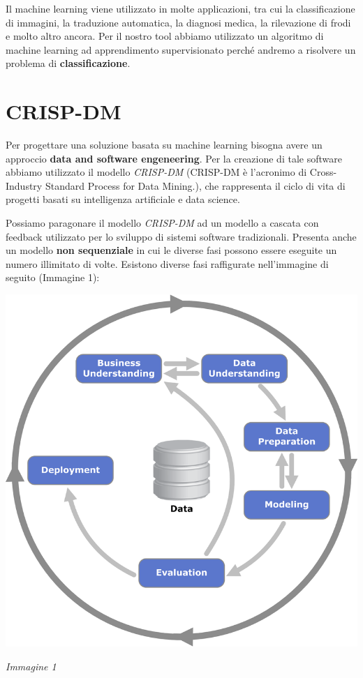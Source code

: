 \documentclass[12pt]{article}
\begin{document}
Il machine learning viene utilizzato in molte applicazioni, tra cui la classificazione di immagini, la traduzione automatica, la diagnosi medica, la rilevazione di frodi e molto altro ancora.
Per il nostro tool abbiamo utilizzato un algoritmo di machine learning ad apprendimento supervisionato perché andremo a risolvere un problema di \textbf{classificazione}.

\section{CRISP-DM}
Per progettare una soluzione basata su machine learning bisogna avere un approccio \textbf{data and software engeneering}.
Per la creazione di tale software abbiamo utilizzato il modello \textit{CRISP-DM} (CRISP-DM è l’acronimo di Cross-Industry Standard Process for Data Mining.),
che rappresenta il ciclo di vita di progetti basati su intelligenza artificiale e data science.

Possiamo paragonare il modello \textit{CRISP-DM} ad un modello a cascata con feedback utilizzato per lo sviluppo di sistemi software
tradizionali. Presenta anche un modello \textbf{non sequenziale} in cui le diverse fasi possono essere eseguite un numero illimitato
di volte. Esistono diverse fasi raffigurate nell'immagine di seguito (Immagine 1):

\begin{center}
    \includegraphics[scale=2.3]{CRISP-DM.png}

    \textit{Immagine 1}
\end{center}
\end{document}
